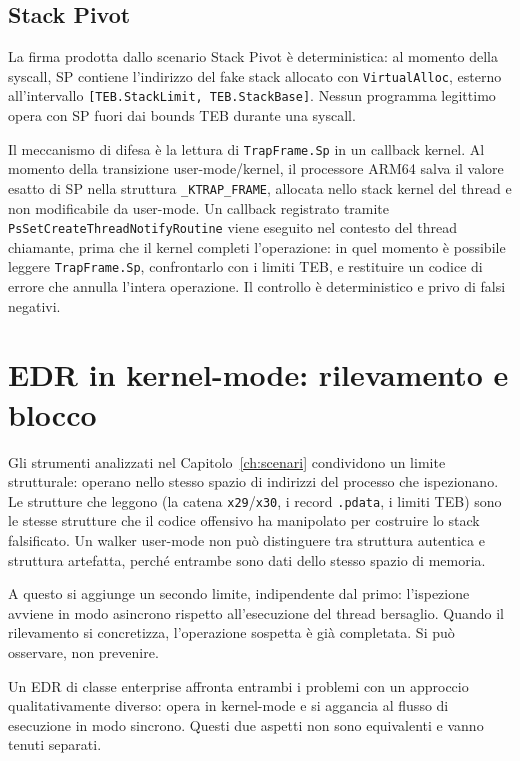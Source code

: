 \subsection{Stack Pivot}

La firma prodotta dallo scenario Stack Pivot è deterministica: al momento della
syscall, SP contiene l'indirizzo del fake stack allocato con
\texttt{VirtualAlloc}, esterno all'intervallo
\texttt{[TEB.StackLimit, TEB.StackBase]}. Nessun programma legittimo opera con
SP fuori dai bounds TEB durante una syscall.

Il meccanismo di difesa è la lettura di \texttt{TrapFrame.Sp} in un callback
kernel. Al momento della transizione user-mode/kernel, il processore ARM64
salva il valore esatto di SP nella struttura \texttt{\_KTRAP\_FRAME}, allocata
nello stack kernel del thread e non modificabile da user-mode. Un callback
registrato tramite \texttt{PsSetCreateThreadNotifyRoutine} viene eseguito nel
contesto del thread chiamante, prima che il kernel completi l'operazione: in
quel momento è possibile leggere \texttt{TrapFrame.Sp}, confrontarlo con i
limiti TEB, e restituire un codice di errore che annulla l'intera operazione.
Il controllo è deterministico e privo di falsi negativi.


\section{EDR in kernel-mode: rilevamento e blocco}
\label{sec:edr-kernel}

Gli strumenti analizzati nel Capitolo~\ref{ch:scenari} condividono un limite
strutturale: operano nello stesso spazio di indirizzi del processo che
ispezionano. Le strutture che leggono (la catena \texttt{x29}/\texttt{x30},
i record \texttt{.pdata}, i limiti TEB) sono le stesse strutture che il
codice offensivo ha manipolato per costruire lo stack falsificato. Un walker
user-mode non può distinguere tra struttura autentica e struttura artefatta,
perché entrambe sono dati dello stesso spazio di memoria.

A questo si aggiunge un secondo limite, indipendente dal primo: l'ispezione
avviene in modo asincrono rispetto all'esecuzione del thread bersaglio. Quando
il rilevamento si concretizza, l'operazione sospetta è già completata. Si può
osservare, non prevenire.

Un EDR di classe enterprise affronta entrambi i problemi con un approccio
qualitativamente diverso: opera in kernel-mode e si aggancia al flusso di
esecuzione in modo sincrono. Questi due aspetti non sono equivalenti e vanno
tenuti separati.

